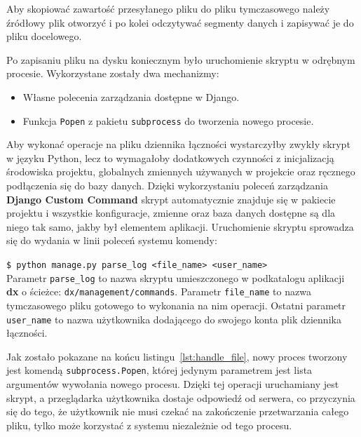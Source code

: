 \documentclass[]{mgr}
\begin{document}
                Aby skopiować zawartość przesyłanego pliku do pliku tymczasowego należy źródłowy plik otworzyć i po kolei odczytywać segmenty danych i zapisywać je do pliku docelowego.

                

                Po zapisaniu pliku na dysku koniecznym było uruchomienie skryptu w odrębnym procesie. Wykorzystane zostały dwa mechanizmy:
                \begin{itemize}
                    \item Własne polecenia zarządzania dostępne w Django.
                    \item Funkcja \texttt{Popen} z pakietu \texttt{subprocess} do tworzenia nowego procesie.
                \end{itemize}

                Aby wykonać operacje na pliku dziennika łączności wystarczyłby zwykły skrypt w języku Python, lecz to wymagałoby dodatkowych czynności z inicjalizacją środowiska projektu, globalnych zmiennych używanych w projekcie oraz ręcznego podłączenia się do bazy danych. Dzięki wykorzystaniu poleceń zarządzania \textbf{Django Custom Command} skrypt automatycznie znajduje się w pakiecie projektu i wszystkie konfiguracje, zmienne oraz baza danych dostępne są dla niego tak samo, jakby był elementem aplikacji. Uruchomienie skryptu sprowadza się do wydania w linii poleceń systemu komendy:

                \texttt{\$ python manage.py parse\_log <file\_name> <user\_name>}\\

                \noindent Parametr \texttt{parse\_log} to nazwa skryptu umieszczonego w podkatalogu aplikacji \textbf{dx} o ścieżce: \texttt{dx/management/commands}. Parametr \texttt{file\_name} to nazwa tymczasowego pliku gotowego to wykonania na nim operacji. Ostatni parametr \texttt{user\_name} to nazwa użytkownika dodającego do swojego konta plik dziennika łączności.

                Jak zostało pokazane na końcu listingu~\ref{lst:handle_file}, nowy proces tworzony jest komendą \texttt{subprocess.Popen}, której jedynym parametrem jest lista argumentów wywołania nowego procesu. Dzięki tej operacji uruchamiany jest skrypt, a przeglądarka użytkownika dostaje odpowiedź od serwera, co przyczynia się do tego, że użytkownik nie musi czekać na zakończenie przetwarzania całego pliku, tylko może korzystać z systemu niezależnie od tego procesu.
\end{document}
